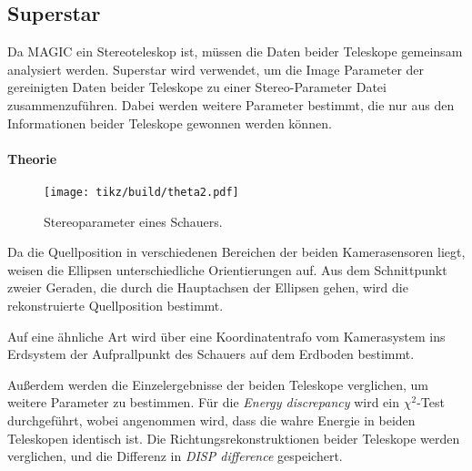 \subsection{Superstar}%
\label{sub:superstar}

Da MAGIC ein Stereoteleskop ist,
müssen die Daten beider Teleskope gemeinsam analysiert werden.
Superstar wird verwendet,
um die Image Parameter der gereinigten Daten beider
Teleskope zu einer Stereo-Parameter Datei zusammenzuführen.
Dabei werden weitere Parameter bestimmt,
die nur aus den Informationen beider Teleskope gewonnen werden können.

\paragraph{Theorie}%

\begin{wrapfigure}[12]{O}{0.4\textwidth}
  \centering
  \texttt{[image: tikz/build/theta2.pdf]}
  \caption{Stereoparameter eines Schauers.}%
  \label{fig:reco}
\end{wrapfigure}

Da die Quellposition in verschiedenen Bereichen der beiden Kamerasensoren
liegt,
weisen die Ellipsen unterschiedliche Orientierungen auf.
Aus dem Schnittpunkt zweier Geraden,
die durch die Hauptachsen der Ellipsen gehen,
wird die rekonstruierte Quellposition bestimmt.

Auf eine ähnliche Art wird über eine Koordinatentrafo vom Kamerasystem ins
Erdsystem der Aufprallpunkt des Schauers auf dem Erdboden
bestimmt.


Außerdem werden die Einzelergebnisse der beiden Teleskope verglichen,
um weitere Parameter zu bestimmen.
Für die \textit{Energy discrepancy} wird
ein $\chi^2$-Test durchgeführt,
wobei angenommen wird,
dass die wahre Energie in beiden Teleskopen identisch ist.
Die Richtungsrekonstruktionen beider Teleskope werden verglichen,
und die Differenz in \textit{DISP difference} gespeichert.
